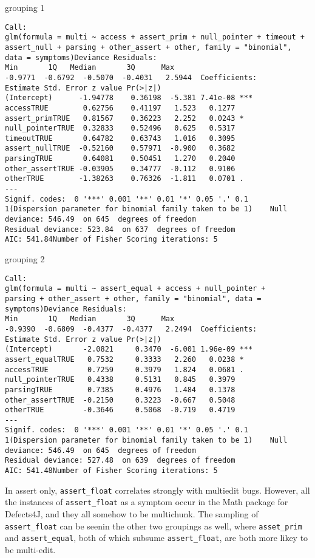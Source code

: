 grouping 1
\begin{lstlisting}
Call:
glm(formula = multi ~ access + assert_prim + null_pointer + timeout +
assert_null + parsing + other_assert + other, family = "binomial",
data = symptoms)Deviance Residuals:
Min       1Q   Median       3Q      Max
-0.9771  -0.6792  -0.5070  -0.4031   2.5944  Coefficients:
Estimate Std. Error z value Pr(>|z|)
(Intercept)      -1.94778    0.36198  -5.381 7.41e-08 ***
accessTRUE        0.62756    0.41197   1.523   0.1277
assert_primTRUE   0.81567    0.36223   2.252   0.0243 *
null_pointerTRUE  0.32833    0.52496   0.625   0.5317
timeoutTRUE       0.64782    0.63743   1.016   0.3095
assert_nullTRUE  -0.52160    0.57971  -0.900   0.3682
parsingTRUE       0.64081    0.50451   1.270   0.2040
other_assertTRUE -0.03905    0.34777  -0.112   0.9106
otherTRUE        -1.38263    0.76326  -1.811   0.0701 .
---
Signif. codes:  0 '***' 0.001 '**' 0.01 '*' 0.05 '.' 0.1   1(Dispersion parameter for binomial family taken to be 1)    Null deviance: 546.49  on 645  degrees of freedom
Residual deviance: 523.84  on 637  degrees of freedom
AIC: 541.84Number of Fisher Scoring iterations: 5
\end{lstlisting}

grouping 2
\begin{lstlisting}
Call:
glm(formula = multi ~ assert_equal + access + null_pointer +
parsing + other_assert + other, family = "binomial", data = symptoms)Deviance Residuals:
Min       1Q   Median       3Q      Max
-0.9390  -0.6809  -0.4377  -0.4377   2.2494  Coefficients:
Estimate Std. Error z value Pr(>|z|)
(Intercept)       -2.0821     0.3470  -6.001 1.96e-09 ***
assert_equalTRUE   0.7532     0.3333   2.260   0.0238 *
accessTRUE         0.7259     0.3979   1.824   0.0681 .
null_pointerTRUE   0.4338     0.5131   0.845   0.3979
parsingTRUE        0.7385     0.4976   1.484   0.1378
other_assertTRUE  -0.2150     0.3223  -0.667   0.5048
otherTRUE         -0.3646     0.5068  -0.719   0.4719
---
Signif. codes:  0 '***' 0.001 '**' 0.01 '*' 0.05 '.' 0.1   1(Dispersion parameter for binomial family taken to be 1)    Null deviance: 546.49  on 645  degrees of freedom
Residual deviance: 527.48  on 639  degrees of freedom
AIC: 541.48Number of Fisher Scoring iterations: 5
\end{lstlisting}

In assert only, \lstinline{assert_float} correlates strongly with multiedit bugs. However, all the instances of \lstinline{assert_float} as a symptom occur in the Math package for Defects4J, and they all somehow to be multichunk. The sampling of \lstinline{assert_float} can be seenin the other two groupings as well, where \lstinline{asset_prim} and \lstinline{assert_equal}, both of which subsume \lstinline{assert_float}, are both more likey to be multi-edit.  

